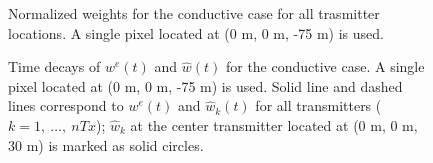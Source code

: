 \documentclass[extra,mreferee]{gji}
\begin{document}
\begin{figure}
  \caption{Normalized weights for the conductive case for all trasmitter locations. A single pixel located at (0 m, 0 m, -75 m) is used. }
  \label{F:NormalizedWeights}
\end{figure}

\begin{figure}
  \caption{Time decays of $w^e(t)$ and $\hat{w}(t)$ for the conductive case. A single pixel located at (0 m, 0 m, -75 m) is used. Solid line and dashed lines correspond to $w^e(t)$ and $\hat{w}_k(t)$ for all transmitters ($k=1,\ \ldots,\ nTx$); $\hat{w}_k$ at the center transmitter located at (0 m, 0 m, 30 m) is marked as solid circles. }
  \label{F:AveragedWe}
\end{figure}
\clearpage
\end{document}
